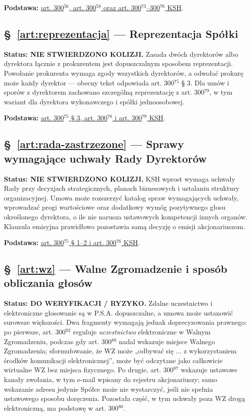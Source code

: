 \documentclass[12pt,a4paper]{report}
\begin{document}
\textbf{Podstawa:} \href{https://eli.gov.pl/api/acts/DU/2024/18/text.html}{art. 300$^{56}$, art. 300$^{58}$ oraz art. 300$^{73}$--300$^{76}$ KSH}.

\subsection*{§~\ref{art:reprezentacja} — Reprezentacja Spółki}
\textbf{Status: NIE STWIERDZONO KOLIZJI.} Zasada dwóch dyrektorów albo dyrektora łącznie z prokurentem jest dopuszczalnym sposobem reprezentacji. Powołanie prokurenta wymaga zgody wszystkich dyrektorów, a odwołać prokurę może każdy dyrektor — obecny tekst odpowiada art. 300$^{75}$ § 3. Dla umów i sporów z dyrektorem zachowano szczególną reprezentację z art. 300$^{79}$, w tym wariant dla dyrektora wykonawczego i spółki jednoosobowej.

\textbf{Podstawa:} \href{https://eli.gov.pl/api/acts/DU/2024/18/text.html}{art. 300$^{75}$ § 3, art. 300$^{78}$ i art. 300$^{79}$ KSH}.

\subsection*{§~\ref{art:rada-zastrzezone} — Sprawy wymagające uchwały Rady Dyrektorów}
\textbf{Status: NIE STWIERDZONO KOLIZJI.} KSH wprost wymaga uchwały Rady przy decyzjach strategicznych, planach biznesowych i ustalaniu struktury organizacyjnej. Umowa może rozszerzyć katalog spraw wymagających uchwały, wprowadzać progi wartościowe oraz dodatkowy wymóg pozytywnego głosu określonego dyrektora, o ile nie narusza ustawowych kompetencji innych organów. Klauzula emisyjna prawidłowo pozostawia samą decyzję o emisji akcjonariuszom.

\textbf{Podstawa:} \href{https://eli.gov.pl/api/acts/DU/2024/18/text.html}{art. 300$^{75}$ § 1--2 i art. 300$^{76}$ KSH}.

\subsection*{§~\ref{art:wz} — Walne Zgromadzenie i sposób obliczania głosów}
\textbf{Status: DO WERYFIKACJI / RYZYKO.} Zdalne uczestnictwo i elektroniczne głosowanie są w P.S.A. dopuszczalne, a umowa może ustanowić surowsze większości. Dwa fragmenty wymagają jednak doprecyzowania prawnego: po pierwsze, art. 300$^{92}$ reguluje \emph{uczestnictwo} elektroniczne w Walnym Zgromadzeniu, podczas gdy art. 300$^{88}$ nadal wskazuje miejsce Walnego Zgromadzenia; sformułowanie, że WZ może „odbywać się ... z wykorzystaniem środków komunikacji elektronicznej”, może być odczytane jako całkowicie wirtualne WZ bez miejsca fizycznego. Po drugie, art. 300$^{87}$ wskazuje ustawowe kanały zwołania, w tym e-mail wpisany do rejestru akcjonariuszy; samo wskazanie adresu jedynie Spółce może nie wystarczyć, jeśli nie spełnia ustawowego sposobu doręczenia. Pozostała część, w tym uchwały poza WZ drogą elektroniczną, ma podstawę w art. 300$^{80}$.
\end{document}
